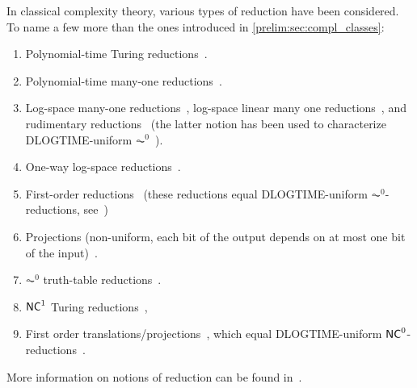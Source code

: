 In classical complexity theory, various types of reduction have been considered.
To name a few more than the ones introduced in \cref{prelim:sec:compl_classes}:
\begin{enumerate}
\item Polynomial-time Turing reductions~\cite{Cook71}.
 
\item Polynomial-time many-one reductions~\cite{Karp1972}.
 
\item Log-space many-one reductions~\cite{Jones75,Stockmeyer73}, log-space linear many one reductions~\cite{Stockmeyer73},
and rudimentary reductions~\cite{Jones75} (the latter notion has been used to characterize DLOGTIME-uniform $\AC^0$~\cite{DBLP:journals/ipl/AllenderG91}).
 
\item One-way log-space reductions~\cite{DBLP:conf/focs/HartmanisIM78}.

\item First-order reductions~\cite{immerman_1980,DBLP:conf/lam/Dahlhaus83} (these reductions equal DLOGTIME-uniform $\AC^0$-reductions, see~\cite{DBLP:books/daglib/0095988})
 
\item Projections (non-uniform, each bit of the output depends on at most one bit of the input)~\cite{DBLP:journals/jacm/SkyumV85}.

\item $\AC^0$ truth-table reductions~\cite{DBLP:journals/siamcomp/ChandraSV84,DBLP:journals/mst/FurstSS84}.
 
\item $\textup{\textsf{NC}}^1$ Turing reductions~\cite{DBLP:journals/iandc/Cook85},

\item First order translations/projections~\cite{DBLP:journals/siamcomp/Immerman87},
which equal DLOGTIME-uniform $\textup{\textsf{NC}}^0$-reductions~\cite{DBLP:journals/jcss/AgrawalAR98}.
\end{enumerate}
More information on notions of reduction can be found in~\cite{DBLP:books/crc/99/AllenderLR99a}.



